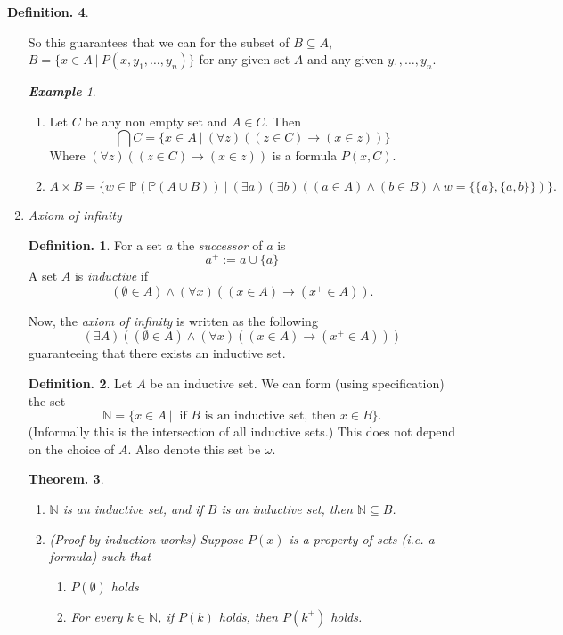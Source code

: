 \documentclass[a4paper,oneside,11pt,DIV=12,parskip=half]{scrartcl}
\newcommand{\N}{\mathbb N}
\theoremstyle{plain}
\newtheorem{theorem}{Theorem.}[section]
\theoremstyle{definition}
\newtheorem{definition}[theorem]{Definition.}
\newtheorem{remark, definition}[theorem]{Remark and Definition.}
\newtheorem{lemma, definition}[theorem]{Lemma and Definition.}
\newtheorem{theorem, definition}[theorem]{Theorem and Definition.}
\theoremstyle{remark}
\newtheorem*{example}{\textbf{Example}}
\newtheorem*{remark, example}{\textbf{Remark and Exercise}}
\begin{document}
\begin{definition}
\begin{enumerate}
    So this guarantees that we can for the subset of $B \subseteq A$, $B = \{ x \in A  ~|~ P(x,y_1,\dots,y_n)\}$
    for any given set $A$ and any given $y_1,\dots,y_n$.
    \begin{example}
    \begin{enumerate}
        \item Let $C$ be any non empty set and $A \in C$. Then
            \[ \bigcap C = \{ x \in A ~|~ (\forall z)((z \in C) \rightarrow (x \in z)) \} \]
        Where $(\forall z)((z \in C) \rightarrow (x \in z))$ is a formula $P(x,C)$.
        \item 
        \[ A \times B = \{ w \in \mathbb{P}(\mathbb{P}(A\cup B)) ~|~ (\exists a) (\exists b) ((a \in A) \land ( b \in B) \land w = \{ \{a\},\{a,b\}\}) \}. \]
    \end{enumerate}
    \end{example}
    \item \emph{Axiom of infinity}
    \begin{definition}
    For a set $a$ the \emph{successor} of $a$ is
        \[ a^+ := a \cup \{a\} \]
    A set $A$ is \emph{inductive} if
        \[ (\emptyset \in A) \land (\forall x)((x \in A) \rightarrow (x^+ \in A)). \]
    \end{definition}
    Now, the \emph{axiom of infinity} is written as the following
        \[ (\exists A)((\emptyset \in A) \land (\forall x)((x \in A) \rightarrow (x^+ \in A))) \]
    guaranteeing that there exists an inductive set.
    \begin{definition}
    Let $A$ be an inductive set. We can form (using specification) the set
        \[ \N = \{ x \in A ~|~ \text{ if $B$ is an inductive set, then $x \in B$} \}. \]
    (Informally this is the intersection of all inductive sets.) This does not depend on the choice of $A$. Also denote this set be $\omega$.
    \end{definition}
    \begin{theorem}\label{Th:natural_numbers}
    \begin{enumerate}
        \item $\N$ is an inductive set, and if $B$ is an inductive set, then $\N \subseteq B$.
        \item (Proof by induction works)
        Suppose $P(x)$ is a property of sets (i.e. a formula) such that
            \begin{enumerate}
                \item $P(\emptyset)$ holds 
                \item For every $k \in \N$, if $P(k)$ holds, then $P(k^+)$ holds. 

\end{enumerate}
\end{enumerate}
\end{theorem}
\end{enumerate}
\end{definition}
\end{document}
